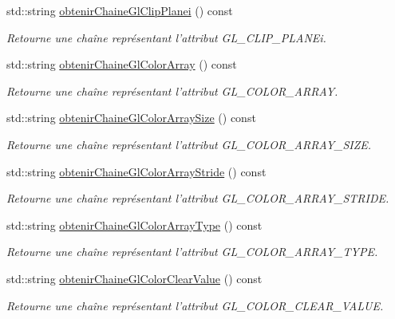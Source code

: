 \begin{DoxyCompactItemize}
std\-::string \hyperlink{group__utilitaire_ga7deb847efbc619585d5e8c9f6600204c}{obtenir\-Chaine\-Gl\-Clip\-Planei} () const 
\begin{DoxyCompactList}\small\item\em Retourne une chaîne représentant l'attribut G\-L\-\_\-\-C\-L\-I\-P\-\_\-\-P\-L\-A\-N\-Ei. \end{DoxyCompactList}\item 
std\-::string \hyperlink{group__utilitaire_ga8fae4f702f9be3574209f0721b6768ba}{obtenir\-Chaine\-Gl\-Color\-Array} () const 
\begin{DoxyCompactList}\small\item\em Retourne une chaîne représentant l'attribut G\-L\-\_\-\-C\-O\-L\-O\-R\-\_\-\-A\-R\-R\-A\-Y. \end{DoxyCompactList}\item 
std\-::string \hyperlink{group__utilitaire_gad1e82d8c71b8e2a76c806e1c92cbb669}{obtenir\-Chaine\-Gl\-Color\-Array\-Size} () const 
\begin{DoxyCompactList}\small\item\em Retourne une chaîne représentant l'attribut G\-L\-\_\-\-C\-O\-L\-O\-R\-\_\-\-A\-R\-R\-A\-Y\-\_\-\-S\-I\-Z\-E. \end{DoxyCompactList}\item 
std\-::string \hyperlink{group__utilitaire_gab499d52456b097364de8300cc6af6808}{obtenir\-Chaine\-Gl\-Color\-Array\-Stride} () const 
\begin{DoxyCompactList}\small\item\em Retourne une chaîne représentant l'attribut G\-L\-\_\-\-C\-O\-L\-O\-R\-\_\-\-A\-R\-R\-A\-Y\-\_\-\-S\-T\-R\-I\-D\-E. \end{DoxyCompactList}\item 
std\-::string \hyperlink{group__utilitaire_gae77f9acd8bdebe2e7bb39660e03b3e28}{obtenir\-Chaine\-Gl\-Color\-Array\-Type} () const 
\begin{DoxyCompactList}\small\item\em Retourne une chaîne représentant l'attribut G\-L\-\_\-\-C\-O\-L\-O\-R\-\_\-\-A\-R\-R\-A\-Y\-\_\-\-T\-Y\-P\-E. \end{DoxyCompactList}\item 
std\-::string \hyperlink{group__utilitaire_ga7de74c129bd5c5038e7f3d03a5508f72}{obtenir\-Chaine\-Gl\-Color\-Clear\-Value} () const 
\begin{DoxyCompactList}\small\item\em Retourne une chaîne représentant l'attribut G\-L\-\_\-\-C\-O\-L\-O\-R\-\_\-\-C\-L\-E\-A\-R\-\_\-\-V\-A\-L\-U\-E. \end{DoxyCompactList}\item 

\end{DoxyCompactItemize}
